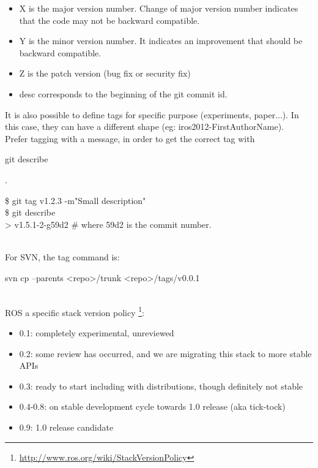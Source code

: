 \begin{itemize}[noitemsep,topsep=0pt,parsep=0pt,partopsep=0pt]
\item X is the major version number. Change of major version number indicates that the code may not be backward compatible.
\item Y is the minor version number. It indicates an improvement that should be backward compatible.
\item Z is the patch version (bug fix or security fix) 
\item desc corresponds to the beginning of the git commit id.
\end{itemize}

It is also possible to define tags for specific purpose (experiments, paper...).
In this case, they can have a different shape (eg: iros2012-FirstAuthorName).\\

Prefer tagging with a message, in order to get the correct tag with \begin{tt}git describe\end{tt}.\\
\begin{tt}
\$ git tag v1.2.3 -m"Small description"\\
\$ git describe\\
> v1.5.1-2-g59d2 \# where 59d2 is the commit number.
\end{tt}\\

For SVN, the tag command is:\\ 
\begin{tt}svn cp --parents <repo>/trunk <repo>/tags/v0.0.1\end{tt}\\


ROS a specific stack version policy \footnote{\url{http://www.ros.org/wiki/StackVersionPolicy}}:
\begin{itemize}[noitemsep,topsep=0pt,parsep=0pt,partopsep=0pt]
\item 0.1: completely experimental, unreviewed
\item 0.2: some review has occurred, and we are migrating this stack to more stable APIs
\item 0.3: ready to start including with distributions, though definitely not stable
\item 0.4-0.8: on stable development cycle towards 1.0 release (aka tick-tock)
\item 0.9: 1.0 release candidate
\end{itemize}


